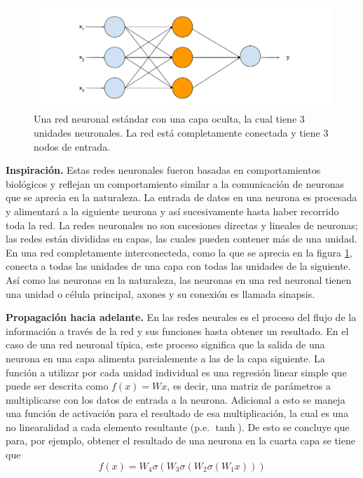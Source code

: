 \begin{figure}
	\includegraphics[scale=.6]{Figures/standardnn.pdf}
	\caption{Una red neuronal estándar con una capa oculta, la cual tiene 3 unidades neuronales. La red está completamente conectada y tiene 3 nodos de entrada.}
	\label{fig:standardnn}
\end{figure}

\textbf{Inspiración.} Estas redes neuronales fueron basadas en comportamientos biológicos y reflejan un comportamiento similar a la comunicación de neuronas que se aprecia en la naturaleza. La entrada de datos en una neurona es procesada y alimentará a la siguiente neurona y así sucesivamente hasta haber recorrido toda la red. La redes neuronales no son sucesiones directas y lineales de neuronas; las redes están divididas en capas, las cuales pueden contener más de una unidad. En una red completamente interconecteda, como la que se aprecia en la figura \ref{fig:standardnn}, conecta a todas las unidades de una capa con todas las unidades de la siguiente. Así como las neuronas en la naturaleza, las neuronas en una red neuronal tienen una unidad o célula principal, axones y su conexión es llamada sinapsis.

\textbf{Propagación hacia adelante.} En las redes neurales es el proceso del flujo de la información a través de la red y sus funciones hasta obtener un resultado. En el caso de una red neuronal típica, este proceso significa que la salida de una neurona en una capa alimenta parcialemente a las de la capa siguiente. La función a utilizar por cada unidad individual es una regresión linear simple que puede ser descrita como $f(x) = W x$, es decir, una matriz de parámetros a multiplicarse con los datos de entrada a la neurona. Adicional a esto se maneja una función de activación para el resultado de esa multiplicación, la cual es una no linearalidad a cada elemento resultante (p.e. $\tanh$). De esto se concluye que para, por ejemplo, obtener el resultado de una neurona en la cuarta capa se tiene que
\begin{equation}
\label{eq:feedfwdeq}
f(x) = W_4 \sigma(W_3 \sigma (W_2 \sigma(W_1 x)))
\end{equation}

